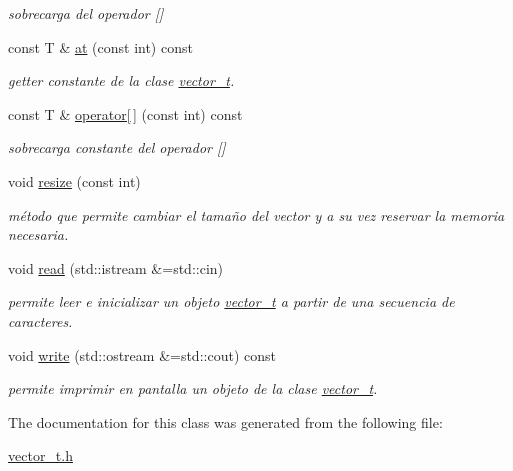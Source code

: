 \begin{DoxyCompactItemize}
\begin{DoxyCompactList}\small\item\em sobrecarga del operador \mbox{[}\mbox{]} \end{DoxyCompactList}\item 
\mbox{\label{classvector__t_a01fa641865ec7b579aa08b78076150d2}} 
const T \& \hyperlink{classvector__t_a01fa641865ec7b579aa08b78076150d2}{at} (const int) const
\begin{DoxyCompactList}\small\item\em getter constante de la clase \hyperlink{classvector__t}{vector\+\_\+t}. \end{DoxyCompactList}\item 
\mbox{\label{classvector__t_a44c63cecf539ce2b71cabe0d372f210f}} 
const T \& \hyperlink{classvector__t_a44c63cecf539ce2b71cabe0d372f210f}{operator\mbox{[}$\,$\mbox{]}} (const int) const
\begin{DoxyCompactList}\small\item\em sobrecarga constante del operador \mbox{[}\mbox{]} \end{DoxyCompactList}\item 
\mbox{\label{classvector__t_a239516986f1c608d1836bd31c2bd5e30}} 
void \hyperlink{classvector__t_a239516986f1c608d1836bd31c2bd5e30}{resize} (const int)
\begin{DoxyCompactList}\small\item\em método que permite cambiar el tamaño del vector y a su vez reservar la memoria necesaria. \end{DoxyCompactList}\item 
\mbox{\label{classvector__t_a3b0f6ecf91062e346f849cc88f9ab709}} 
void \hyperlink{classvector__t_a3b0f6ecf91062e346f849cc88f9ab709}{read} (std\+::istream \&=std\+::cin)
\begin{DoxyCompactList}\small\item\em permite leer e inicializar un objeto \hyperlink{classvector__t}{vector\+\_\+t} a partir de una secuencia de caracteres. \end{DoxyCompactList}\item 
\mbox{\label{classvector__t_a62f6c0cd2798964c3ca5c0267136feb9}} 
void \hyperlink{classvector__t_a62f6c0cd2798964c3ca5c0267136feb9}{write} (std\+::ostream \&=std\+::cout) const
\begin{DoxyCompactList}\small\item\em permite imprimir en pantalla un objeto de la clase \hyperlink{classvector__t}{vector\+\_\+t}. \end{DoxyCompactList}\end{DoxyCompactItemize}


The documentation for this class was generated from the following file\+:\begin{DoxyCompactItemize}
\item 
\hyperlink{vector__t_8h}{vector\+\_\+t.\+h}\end{DoxyCompactItemize}
